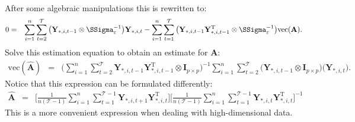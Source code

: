 \documentclass[a4paper]{article}
\theoremstyle{myexamplestyle}
\begin{document}
\begin{eqnarray*}
\end{eqnarray*}
After some algebraic manipulations this is rewritten to:
\begin{eqnarray*}
0 & = & \sum_{i=1}^n \sum_{t=2}^{\mathcal{T}} \big( \mathbf{Y}_{\ast,i,t-1}  \otimes \SSigma_{\varepsilon}^{-1}\big)
\mathbf{Y}_{\ast,i,t} -
\sum_{i=1}^n \sum_{t=1}^{\mathcal{T}} \big( \mathbf{Y}_{\ast,i,t-1} \mathbf{Y}_{\ast,i,t-1}^{\mathrm{T}} \otimes \SSigma_{\varepsilon}^{-1}\big) \mbox{vec}(\mathbf{A}).
\end{eqnarray*}
Solve this estimation equation to obtain an estimate for $\mathbf{A}$:
\begin{eqnarray*}
\mbox{vec}(\hat{\mathbf{A}}) & = &
\Big(
\sum_{i=1}^n \sum_{t=2}^{\mathcal{T}} \mathbf{Y}_{\ast,i,t-1} \mathbf{Y}_{\ast,i,t-1}^{\mathrm{T}} \otimes \mathbf{I}_{p \times p}
\Big)^{-1}
\sum_{i=1}^n \sum_{t=2}^{\mathcal{T}} \big( \mathbf{Y}_{\ast,i,t-1}  \otimes \mathbf{I}_{p \times p} \big)
\big(\mathbf{Y}_{\ast,i,t}\big).
\end{eqnarray*}
Notice that this expression can be formulated differently:
\begin{eqnarray*}
\hat{\mathbf{A}} & = &  \Big[ \frac{1}{n(\mathcal{T}-1)} \sum_{i=1}^n \sum_{t=1}^{\mathcal{T}-1}  \mathbf{Y}_{\ast,i,t+1} \mathbf{Y}_{\ast,i,t}^{\mathrm{T}} \Big] \Big[ \frac{1}{n({\mathcal{T}}-1)} \sum_{i=1}^n \sum_{t=1}^{{\mathcal{T}}-1}  \mathbf{Y}_{\ast,i,t} \mathbf{Y}_{\ast,i,t}^{\mathrm{T}} \Big]^{-1}
\end{eqnarray*}
This is a more convenient expression when dealing with high-dimensional data.
\end{document}
